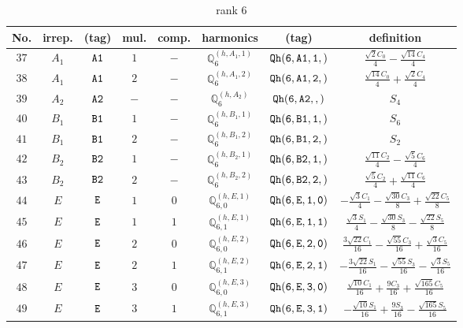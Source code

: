 \documentclass[fleqn,8pt]{jsarticle}
\begin{document}
\begin{table}[ht!]
\begin{center}
\caption{rank 6}
\renewcommand{\arraystretch}{1.3}
\begin{tabular}{cccccccc} \hline \hline
No. & irrep. & (tag) & mul. & comp. & harmonics & (tag) & definition \\ \hline
$ 37 $ & $ A_{1} $ & $ {\tt A1} $ & $ 1 $ & $ - $ & $ \mathbb{Q}_{6}^{(h,A_{1},1)} $ & $ {\tt Qh(6,A1,1,)} $ & $ \frac{\sqrt{2} C_{0}}{4} - \frac{\sqrt{14} C_{4}}{4} $ \\
$ 38 $ & $ A_{1} $ & $ {\tt A1} $ & $ 2 $ & $ - $ & $ \mathbb{Q}_{6}^{(h,A_{1},2)} $ & $ {\tt Qh(6,A1,2,)} $ & $ \frac{\sqrt{14} C_{0}}{4} + \frac{\sqrt{2} C_{4}}{4} $ \\
$ 39 $ & $ A_{2} $ & $ {\tt A2} $ & $ - $ & $ - $ & $ \mathbb{Q}_{6}^{(h,A_{2})} $ & $ {\tt Qh(6,A2,,)} $ & $ S_{4} $ \\
$ 40 $ & $ B_{1} $ & $ {\tt B1} $ & $ 1 $ & $ - $ & $ \mathbb{Q}_{6}^{(h,B_{1},1)} $ & $ {\tt Qh(6,B1,1,)} $ & $ S_{6} $ \\
$ 41 $ & $ B_{1} $ & $ {\tt B1} $ & $ 2 $ & $ - $ & $ \mathbb{Q}_{6}^{(h,B_{1},2)} $ & $ {\tt Qh(6,B1,2,)} $ & $ S_{2} $ \\
$ 42 $ & $ B_{2} $ & $ {\tt B2} $ & $ 1 $ & $ - $ & $ \mathbb{Q}_{6}^{(h,B_{2},1)} $ & $ {\tt Qh(6,B2,1,)} $ & $ \frac{\sqrt{11} C_{2}}{4} - \frac{\sqrt{5} C_{6}}{4} $ \\
$ 43 $ & $ B_{2} $ & $ {\tt B2} $ & $ 2 $ & $ - $ & $ \mathbb{Q}_{6}^{(h,B_{2},2)} $ & $ {\tt Qh(6,B2,2,)} $ & $ \frac{\sqrt{5} C_{2}}{4} + \frac{\sqrt{11} C_{6}}{4} $ \\
$ 44 $ & $ E $ & $ {\tt E} $ & $ 1 $ & $ 0 $ & $ \mathbb{Q}_{6,0}^{(h,E,1)} $ & $ {\tt Qh(6,E,1,0)} $ & $ - \frac{\sqrt{3} C_{1}}{4} - \frac{\sqrt{30} C_{3}}{8} + \frac{\sqrt{22} C_{5}}{8} $ \\
$ 45 $ & $ E $ & $ {\tt E} $ & $ 1 $ & $ 1 $ & $ \mathbb{Q}_{6,1}^{(h,E,1)} $ & $ {\tt Qh(6,E,1,1)} $ & $ \frac{\sqrt{3} S_{1}}{4} - \frac{\sqrt{30} S_{3}}{8} - \frac{\sqrt{22} S_{5}}{8} $ \\
$ 46 $ & $ E $ & $ {\tt E} $ & $ 2 $ & $ 0 $ & $ \mathbb{Q}_{6,0}^{(h,E,2)} $ & $ {\tt Qh(6,E,2,0)} $ & $ \frac{3 \sqrt{22} C_{1}}{16} - \frac{\sqrt{55} C_{3}}{16} + \frac{\sqrt{3} C_{5}}{16} $ \\
$ 47 $ & $ E $ & $ {\tt E} $ & $ 2 $ & $ 1 $ & $ \mathbb{Q}_{6,1}^{(h,E,2)} $ & $ {\tt Qh(6,E,2,1)} $ & $ - \frac{3 \sqrt{22} S_{1}}{16} - \frac{\sqrt{55} S_{3}}{16} - \frac{\sqrt{3} S_{5}}{16} $ \\
$ 48 $ & $ E $ & $ {\tt E} $ & $ 3 $ & $ 0 $ & $ \mathbb{Q}_{6,0}^{(h,E,3)} $ & $ {\tt Qh(6,E,3,0)} $ & $ \frac{\sqrt{10} C_{1}}{16} + \frac{9 C_{3}}{16} + \frac{\sqrt{165} C_{5}}{16} $ \\
$ 49 $ & $ E $ & $ {\tt E} $ & $ 3 $ & $ 1 $ & $ \mathbb{Q}_{6,1}^{(h,E,3)} $ & $ {\tt Qh(6,E,3,1)} $ & $ - \frac{\sqrt{10} S_{1}}{16} + \frac{9 S_{3}}{16} - \frac{\sqrt{165} S_{5}}{16} $ \\
 \hline \hline
\end{tabular}
\end{center}
\end{table}
\end{document}

